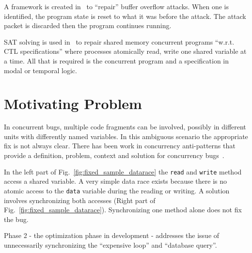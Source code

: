 \documentclass{llncs}
\begin{document}
A framework is created in~\cite{CB05} to ``repair'' buffer overflow attacks.
When one is identified, the program state is reset to what it was before the
attack. The attack packet is discarded then the program continues running.

SAT solving is used in~\cite{AY07}  to repair shared memory concurrent programs
``w.r.t. CTL specifications'' where processes atomically read, write one shared
variable at a time. All that is required is the concurrent program and a
specification in modal or temporal logic.

\section{Motivating Problem}
\label{sec:motivation}

In concurrent bugs, multiple code fragments can be involved, possibly in different units with
differently named variables. In this ambiguous scenario the appropriate fix is
not always clear. There has been work in concurrency anti-patterns that provide
a definition, problem, context and solution for concurrency
bugs~\cite{BJ09,FKLV12}.

In the left part of Fig.~\ref{fig:fixed_sample_datarace} the \texttt{read} and
\texttt{write} method access a shared variable. A very simple data race exists
because there is no atomic access to the \texttt{data} variable during the
reading or writing.
A solution involves synchronizing both accesses (Right part of
Fig.~\ref{fig:fixed_sample_datarace}). Synchronizing one method alone does not
fix the bug.

Phase 2 - the optimization phase in development - addresses the issue of unnecessarily
synchronizing the ``expensive loop'' and ``database query''.

\end{document}
